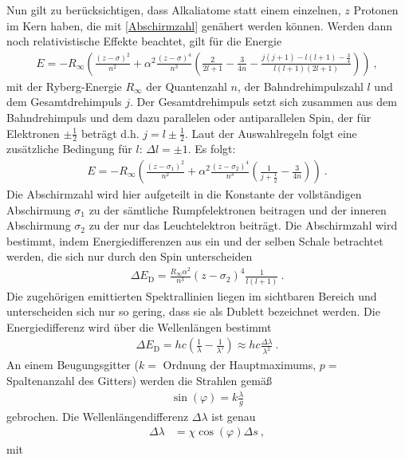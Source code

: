 Nun gilt zu berücksichtigen, dass Alkaliatome statt einem einzelnen, $z$ Protonen im Kern haben, die mit \eqref{Abschirmzahl} genähert werden können. Werden dann noch relativistische Effekte beachtet, gilt für die Energie \begin{align}
	E = - R_\infty \left( \frac{(z-\sigma)^2}{n^2} + \alpha^2 \frac{(z-\sigma)^4}{n^3}\left(\frac{2}{2 l + 1}  - \frac{3}{4n}  - \frac{j(j+1) - l(l+1)-\frac{3}{4}}{l(l+1)(2l+1) }\right) \right) \ ,
\end{align}
mit der Ryberg-Energie $R_\infty$ der Quantenzahl $n$, der Bahndrehimpulszahl $l$ und dem Gesamtdrehimpuls $j$. Der Gesamtdrehimpuls setzt sich zusammen aus dem Bahndrehimpuls und dem dazu parallelen oder antiparallelen Spin, der für Elektronen $\pm\frac{1}{2}$ beträgt d.h. $j = l \pm \frac{1}{2}$. Laut der Auswahlregeln folgt eine zusätzliche Bedingung für $l$: $\Delta l = \pm 1$.
Es folgt:
\begin{align}
	E = - R_\infty \left( \frac{(z-\sigma_1)^2}{n^2} + \alpha^2 \frac{(z-\sigma_2)^4}{n^3}\left(\frac{1}{j+\frac{1}{2}}  - \frac{3}{4n}\right) \right) \ .
\end{align}
Die Abschirmzahl wird hier aufgeteilt in die Konstante der  vollständigen Abschirmung $\sigma_1$ zu der sämtliche Rumpfelektronen beitragen und der inneren Abschirmung $\sigma_2$ zu der nur das Leuchtelektron beiträgt. Die Abschirmzahl wird bestimmt, indem Energiedifferenzen aus ein und der selben Schale betrachtet werden, die sich nur durch den Spin unterscheiden
\begin{align}\label{Abschirm}
	\Delta E_\text{D} = \frac{R_\infty\alpha^2}{n^3}(z-\sigma_2)^4\frac{1}{l(l+1)} \ .
\end{align}
Die zugehörigen emittierten Spektrallinien liegen im sichtbaren Bereich und unterscheiden sich nur so gering, dass sie als Dublett bezeichnet werden. Die Energiedifferenz wird über die Wellenlängen bestimmt
\begin{align}\label{DeltaE}
	\Delta E_\text{D} = hc\left(\frac{1}{\lambda}-\frac{1}{\lambda'}\right) \approx hc\frac{\Delta \lambda}{\lambda^2} \ .
\end{align}
An einem Beugungsgitter ($k =$ Ordnung der Hauptmaximums, $p =$ Spaltenanzahl des Gitters) werden die Strahlen gemäß
\begin{align}\label{Gitterkonstante}
	\sin(\varphi) = k\frac{\lambda}{g}
\end{align}
gebrochen.
Die Wellenlängendifferenz $\Delta \lambda$ ist genau
\begin{align}\label{DeltaLambda}
	\Delta \lambda &= \chi \cos(\varphi)\Delta s \ ,
\end{align}	
mit

